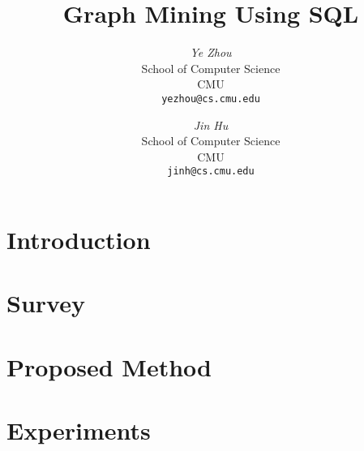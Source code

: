 \documentclass[12pt]{article}
\begin{document}
\newcommand{\beq}{\begin{equation}}
\newcommand{\eeq}{\end{equation}}
\newcommand{\bit}{\begin{itemize*}}
\newcommand{\eit}{\end{itemize*}}
\newcommand{\goal}[1]{ {\noindent {$\Rightarrow$} \em {#1} } }
\newcommand{\hide}[1]{}
\newcommand{\comment}[1]{ {\footnotesize {#1} } }
\newtheorem{lemma}{Lemma}
\newtheorem{theorem}{Theorem}
\newtheorem{proof}{Proof}
\newtheorem{defn}{Definition}
\newtheorem{algo}{Algorithm}
\newtheorem{observation}{Observation}

\title{Graph Mining Using SQL}


\author{ 
	{\em Ye Zhou} \\
	    School of Computer Science \\
	    CMU\\
	    {\tt yezhou@cs.cmu.edu}
	 \and
	 {\em Jin Hu} \\
	     School of Computer Science \\
	    CMU\\
	     {\tt jinh@cs.cmu.edu}
}


\maketitle
\begin{abstract}
    
\end{abstract}

\section{Introduction}
    \label{sec:intro}
    

\section{Survey}
    \label{sec:survey}
    

\section{Proposed Method}
    \label{sec:proposed}
    


\section{Experiments}
    \label{sec:experiments}
    
\end{document}
